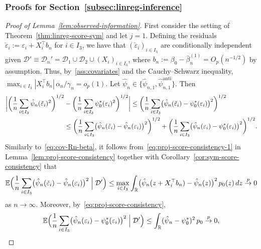 \documentclass[a4paper]{article}
\newcommand{\R}{\mathbb{R}}
\newcommand{\E}{\mathbb{E}}
\newcommand{\cvp}{\overset{p}{\to}}
\theoremstyle{definition}
\begin{document}
\subsubsection{Proofs for Section~\ref{subsec:linreg-inference}}

\begin{proof}[Proof of Lemma~\ref{lem:observed-information}]

First consider the setting of Theorem~\ref{thm:linreg-score-sym} and let $j = 1$. Defining the residuals $\check{\varepsilon}_i := \varepsilon_i + X_i^\top b_n$ for $i \in I_3$, we have that $(\check{\varepsilon}_i)_{i \in I_3}$ are conditionally independent given $\mathcal{D}' \equiv \mathcal{D}_n' = \mathcal{D}_1 \cup \mathcal{D}_2 \cup (X_i)_{i \in I_3}$, where $b_n := \beta_0 - \bar{\beta}_n^{(1)} = O_p(n^{-1/2})$ by assumption. Thus, by~\ref{ass:covariates} and the Cauchy--Schwarz inequality, $\max_{i \in I_3}|X_i^\top b_n|\,\alpha_n/\gamma_n = o_p(1)$. Let $\hat{\psi}_n \in \{\hat{\psi}_{n,1},\hat{\psi}_{n,1}^{\mathrm{anti}}\}$. Then 
\begin{align}
\biggl|\biggl(\frac{1}{n}\sum_{i \in I_3} \hat{\psi}_n(\check{\varepsilon}_i)^2\biggr)^{1/2} &- \biggl(\frac{1}{n}\sum_{i \in I_3} \psi_0^*(\varepsilon_i)^2\biggr)^{1/2}\biggr| \leq \biggl(\frac{1}{n}\sum_{i \in I_3} \bigl(\hat{\psi}_n(\check{\varepsilon}_i) - \psi_0^*(\varepsilon_i)\bigr)^2\biggr)^{1/2} \notag \\
\label{eq:observed-information-0}
&\leq \biggl(\frac{1}{n}\sum_{i \in I_3} \bigl(\hat{\psi}_n(\check{\varepsilon}_i) - \hat{\psi}_n(\varepsilon_i)\bigr)^2\biggr)^{1/2} + \biggl(\frac{1}{n}\sum_{i \in I_3} \bigl(\hat{\psi}_n(\varepsilon_i) - \psi_0^*(\varepsilon_i)\bigr)^2\biggr)^{1/2}.
\end{align}
Similarly to~\eqref{eq:cov-Rn-beta}, it follows from~\eqref{eq:proj-score-consistency-1} in Lemma~\ref{lem:proj-score-consistency} together with Corollary~\ref{cor:sym-score-consistency} that
\begin{align}
\label{eq:observed-information-1}
\E\Bigl(\frac{1}{n}\sum_{i \in I_3} \bigl(\hat{\psi}_n(\check{\varepsilon}_i) - \hat{\psi}_n(\varepsilon_i)\bigr)^2 \Bigm| \mathcal{D}'\Bigr) \leq \max_{i \in I_3}\int_\R \bigl(\hat{\psi}_n(z + X_i^\top b_n) - \hat{\psi}_n(z)\bigr)^2\,p_0(z)\,dz \cvp 0
\end{align}
as $n \to \infty$. Moreover, by~\eqref{eq:proj-score-consistency},
\begin{align}
\label{eq:observed-information-2}
\E\Bigl(\frac{1}{n}\sum_{i \in I_3} \bigl(\hat{\psi}_n(\varepsilon_i) - \psi_0^*(\varepsilon_i)\bigr)^2 \Bigm| \mathcal{D}'\Bigr) \leq \int_\R (\hat{\psi}_n - \psi_0^*)^2\,p_0 \cvp 0,

\end{align}
\end{proof}
\end{document}
